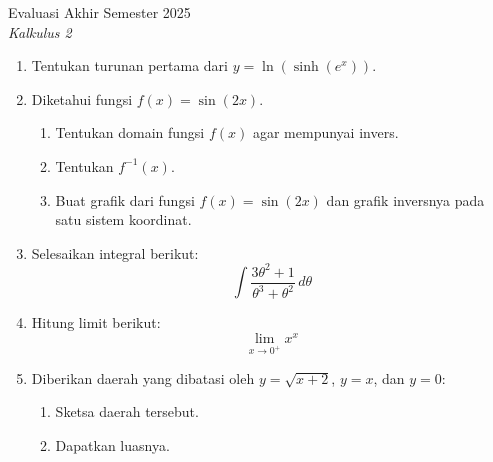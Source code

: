 \documentclass[12pt]{article}
\begin{document}
\begin{center}
    {Evaluasi Akhir Semester 2025} \\
    \textit{Kalkulus 2} \\
\end{center}

\vspace{0.5cm}

\begin{enumerate}
    \item Tentukan turunan pertama dari $y = \ln(\sinh(e^x))$.

    \item Diketahui fungsi $f(x) = \sin(2x)$.
    \begin{enumerate}
        \item Tentukan domain fungsi $f(x)$ agar mempunyai invers.
        \item Tentukan $f^{-1}(x)$.
        \item Buat grafik dari fungsi $f(x) = \sin(2x)$ dan grafik inversnya pada satu sistem koordinat.
    \end{enumerate}

    \item Selesaikan integral berikut:
    \[
        \int \frac{3\theta^2 + 1}{\theta^3 + \theta^2} \, d\theta 
    \]

    \item Hitung limit berikut:
    \[
        \lim_{x \to 0^+} x^{x}
    \]

    \item Diberikan daerah yang dibatasi oleh $y = \sqrt{x+2}$, $y = x$, dan $y = 0$:
    \begin{enumerate}
        \item Sketsa daerah tersebut.
        \item Dapatkan luasnya.
    \end{enumerate}
\end{enumerate}
\end{document}
